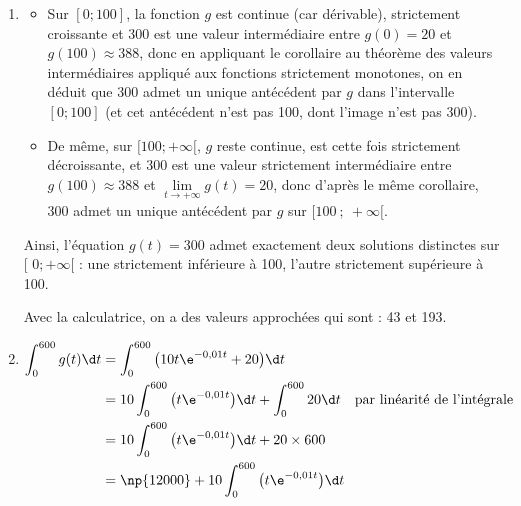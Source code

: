 \begin{enumerate}
\begin{enumerate}
On calcule $g(0) = 10\times 0 \times \e^{0}+20 = 20$ et $g(100) = 10 \times 100 \times \e^{-1} + 20 = 1000\e^{-1} + 20$ (avec $g(100)\approx 388$).

On peut donc établir le tableau de variations suivant :

\hfill~\hfill~
\end{enumerate}

	\item \begin{itemize}[label=$\bullet~$]
		\item Sur $[0 ; 100]$, la fonction $g$ est continue (car dérivable), strictement croissante et 300 est une valeur intermédiaire entre $g(0) = 20$ et $g(100)\approx 388$, donc en appliquant le corollaire au théorème des valeurs intermédiaires appliqué aux fonctions strictement monotones, on en déduit que 300 admet un unique antécédent par $g$ dans l'intervalle $[0;100]$ (et cet antécédent n'est pas 100, dont l'image n'est pas 300).
		\item De même, sur $[100;+\infty[$, $g$ reste continue, est cette fois strictement décroissante, et 300 est une valeur strictement intermédiaire entre $g(100)\approx 388$ et \linebreak $\lim\limits_{t\to +\infty}g(t) = 20$, donc d'après le même corollaire, $300$ admet un unique antécédent par $g$ sur $[100~;~+\infty[$.
	\end{itemize}

Ainsi, l'équation $g(t) = 300$ admet exactement deux solutions distinctes sur [ $0; + \infty[$ : une strictement inférieure à 100, l'autre strictement supérieure à 100.

Avec la calculatrice, on a des valeurs approchées qui sont : 43 et 193.

	\item $\aligned[t] \displaystyle \int_{0}^{600} g(t) \d t
	&= \int_{0}^{600} \big(10t\e^{-0,01t} + 20\big) \d t \\
	&= 10 \int_{0}^{600} \big(t\e^{-0,01t}\big) \d t  + \int_{0}^{600} 20 \d t \quad\text{par linéarité de l'intégrale}\\
	&= 10 \int_{0}^{600} \big(t\e^{-0,01t}\big) \d t  + 20\times 600\\
	&= \np{12000} + 10 \int_{0}^{600} \big(t\e^{-0,01t}\big) \d t\\
	\endaligned$


\end{enumerate}
